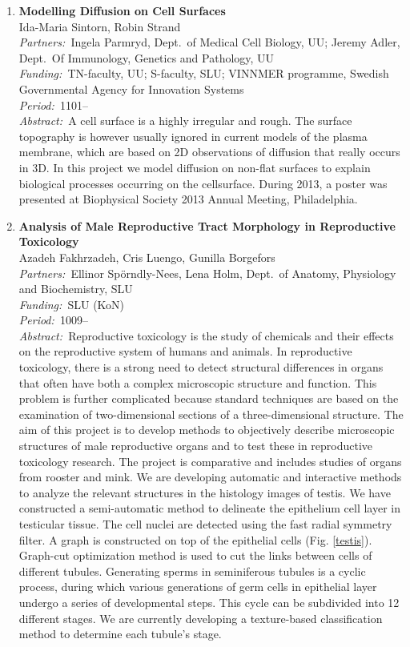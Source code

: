 \documentclass[10pt, a4paper]{article}
\newcommand{\aabstract}[1]{\emph{Abstract:~}#1}
\newcommand{\ffunding}[1]{\emph{Funding:~}#1\\}
\newcommand{\ppartners}[1]{\emph{Partners:~}#1\\}
\newcommand{\pperiod}[1]{\emph{Period:~}#1\\}
\begin{document}
\begin{enumerate}

\item %
\label{proj:cellsurfaceDiffusion}
\textbf{Modelling Diffusion on Cell Surfaces}\\
Ida-Maria Sintorn, Robin Strand \\
\ppartners{Ingela Parmryd, Dept.~of Medical Cell Biology, UU; Jeremy Adler, Dept.~Of Immunology, Genetics and Pathology, UU}
\ffunding{TN-faculty, UU; S-faculty, SLU; VINNMER programme, Swedish Governmental Agency for Innovation Systems}
\pperiod{1101--}
\aabstract{A cell surface is a highly irregular and rough. The surface
topography is however usually ignored in current models of the
plasma membrane, which are based on 2D observations of diffusion
that really occurs in 3D. In this project we model diffusion on
non-flat surfaces to explain biological processes occurring on the
cellsurface. During 2013, a poster was presented at Biophysical Society 2013 Annual Meeting, Philadelphia.}


\item 
\textbf{Analysis of Male Reproductive Tract Morphology in Reproductive Toxicology}\\
Azadeh Fakhrzadeh, Cris Luengo, Gunilla Borgefors\\
\ppartners{Ellinor Sp\"{o}rndly-Nees,  Lena Holm, Dept.~of Anatomy, Physiology and Biochemistry, SLU}
\ffunding{SLU (KoN)}
\pperiod{1009--}
\aabstract{Reproductive toxicology is the study of chemicals and their effects on the reproductive system of humans and animals. In reproductive toxicology, there is a strong need to detect structural differences in organs that often have both a complex microscopic structure and function. This problem is further complicated because standard techniques are based on the examination of two-dimensional sections of a three-dimensional structure. The aim of this project is to develop methods to objectively describe microscopic structures of male reproductive organs and to test these in reproductive toxicology research. The project is comparative and  includes studies of organs from rooster and mink. We are developing automatic and interactive methods to analyze the relevant structures in the histology images of testis. We have constructed a semi-automatic method to delineate the epithelium cell layer in testicular tissue.
The cell nuclei are detected using the fast radial symmetry filter. A graph is constructed on top of the epithelial cells (Fig. \ref{testis}). Graph-cut optimization method is used to cut the links between cells of different tubules. Generating sperms in seminiferous tubules is a cyclic process, during which various generations of germ cells in epithelial layer undergo a series of developmental steps. This cycle can be subdivided into 12 different stages. We are currently developing a texture-based classification method to determine each tubule's stage.}


\end{enumerate}
\end{document}
